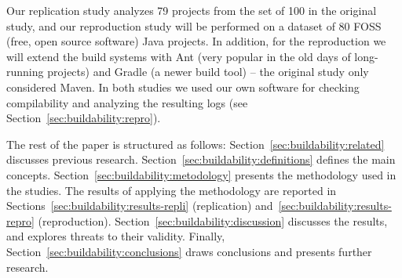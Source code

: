 Our replication study analyzes 79 projects from the set of 100 in the original study, and our reproduction study will be performed on a dataset of 80 FOSS (free, open source software) Java projects. In addition, for the reproduction we will extend the build systems with Ant (very popular in the old days of long-running projects) and Gradle (a newer build tool) -- the original study only considered Maven. In both studies we used our own software for checking compilability and analyzing the resulting logs (see Section~\ref{sec:buildability:repro}).












The rest of the paper is structured as follows:
Section~\ref{sec:buildability:related} discusses previous research. 
Section~\ref{sec:buildability:definitions} defines the main concepts.
Section~\ref{sec:buildability:metodology} presents the methodology used in the studies. 
The results of applying the methodology are reported in Sections~\ref{sec:buildability:results-repli} (replication) and~\ref{sec:buildability:results-repro} (reproduction).
Section~\ref{sec:buildability:discussion} discusses the results, and explores threats to their validity.
Finally, Section~\ref{sec:buildability:conclusions} draws conclusions and presents further research.
